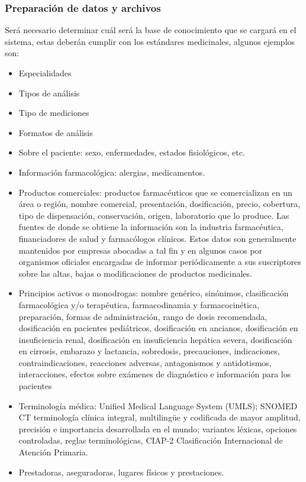 \documentclass[a4paper,12pt]{article}
\begin{document}
	\subsubsection{Preparación de datos y archivos}
	Será necesario determinar cuál será la base de conocimiento que se cargará en el sistema, estas deberán cumplir con los estándares medicinales, algunos ejemplos son:
    \begin{itemize}
        \item Especialidades
        \item Tipos de  análisis
        \item Tipo de mediciones 
        \item Formatos de análisis
        \item Sobre el paciente: sexo, enfermedades, estados fisiológicos, etc.
        \item Información farmacológica: alergias, medicamentos.
        \item Productos comerciales: productos farmacéuticos que se comercializan en un área o región, nombre comercial, presentación, dosificación, precio, cobertura, tipo de dispensación, conservación, origen, laboratorio que lo produce. Las fuentes de donde se obtiene la información son la industria farmacéutica, financiadores de salud y farmacólogos clínicos. Estos datos son generalmente mantenidos por empresas abocadas a tal fin y en algunos casos por organismos oficiales encargadas de informar periódicamente a sus suscriptores sobre las altas, bajas o modificaciones de productos medicinales.
        \item Principios activos o monodrogas: nombre genérico, sinónimos, clasificación farmacológica y/o terapéutica, farmacodinamia y farmacocinética, preparación, formas de administración, rango de dosis recomendada, dosificación en pacientes pediátricos, dosificación en ancianos, dosificación en insuficiencia renal, dosificación en insuficiencia hepática severa, dosificación en cirrosis, embarazo y lactancia, sobredosis, precauciones, indicaciones, contraindicaciones, reacciones adversas, antagonismos y antidotismos, interacciones, efectos sobre exámenes de diagnóstico e información para los pacientes
        \item Terminología médica: Unified Medical Language System (UMLS); SNOMED CT  terminología clínica integral, multilingüe y codificada de mayor amplitud, precisión e importancia desarrollada en el mundo; variantes léxicas, opciones controladas, reglas terminológicas, CIAP-2 Clasificación Internacional de Atención Primaria.
        \item Prestadoras, aseguradoras, lugares físicos y prestaciones.
	\end{itemize} 
    
\end{document}

